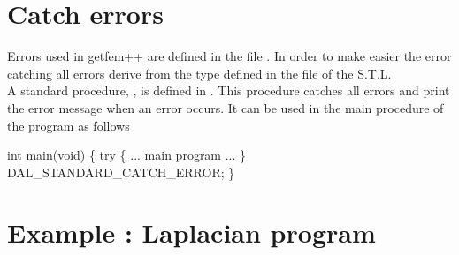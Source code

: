 \documentclass[11pt,a4paper]{article}
\begin{document}
\section{Catch errors}

Errors used in getfem++ are defined in the file . In order to make easier  the error catching all errors derive from the type  defined in the file  of the S.T.L.\\[0.5cm]
A standard procedure, , is defined in . This procedure catches all errors and print the error message when an error occurs. It can be used in the main procedure of the program as follows\\[0.5cm]
\begin{cppcode}
  int main(void) \{ 
    try \{ 
      ... main program ... 
        \} 
     DAL\_STANDARD\_CATCH\_ERROR;
  \}
\end{cppcode}

\section{Example : Laplacian program}
\end{document}
